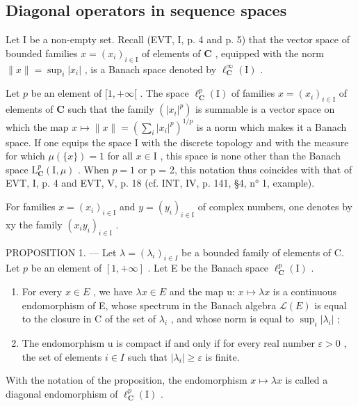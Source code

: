 \subsection{Diagonal operators in sequence spaces}

Let I be a non-empty set. Recall (EVT, I, p. 4 and p. 5) that the vector space of bounded families \(x = (x_i)_{i \in \mathrm{I}}\) of elements of \(\mathbf{C}\) , equipped with the norm \(\| x \| = \sup_i |x_i|\) , is a Banach space denoted by \(\ell_{\mathbf{C}}^{\infty}(\mathrm{I})\) .

Let \(p\) be an element of \([1, +\infty[\) . The space \(\ell_{\mathbf{C}}^{p}(\mathrm{I})\) of families \(x = (x_{i})_{i \in \mathrm{I}}\) of elements of \(\mathbf{C}\) such that the family \((|x_{i}|^{p})\) is summable is a vector space on which the map \(x \mapsto \| x \| = (\sum_{i} |x_{i}|^{p})^{1/p}\) is a norm which makes it a Banach space. If one equips the space I with the discrete topology and with the measure for which \(\mu(\{x\}) = 1\) for all \(x \in \mathrm{I}\) , this space is none other than the Banach space \(\mathrm{L}_{\mathbf{C}}^{p}(\mathrm{I}, \mu)\) . When \(p = 1\) or p = 2, this notation thus coincides with that of EVT, I, p. 4 and EVT, V, p. 18 (cf. INT, IV, p. 141, §4, n° 1, example).

For families \(x = (x_{i})_{i \in \mathrm{I}}\) and \(y = (y_{i})_{i \in \mathrm{I}}\) of complex numbers, one denotes by xy the family \((x_{i}y_{i})_{i \in \mathrm{I}}\) .

PROPOSITION 1. --- Let \(\lambda = (\lambda_i)_{i\in I}\) be a bounded family of elements of C. Let \(p\) be an element of \([1, +\infty]\) . Let E be the Banach space \(\ell_{\mathbf{C}}^p (\mathrm{I})\) .

\begin{enumerate}
\def\labelenumi{\alph{enumi})}
\item
  For every \(x \in E\) , we have \(\lambda x \in E\) and the map u: \(x \mapsto \lambda x\) is a continuous endomorphism of E, whose spectrum in the Banach algebra \(\mathcal{L}(E)\) is equal to the closure in C of the set of \(\lambda_{i}\) , and whose norm is equal to \(\sup_{i} |\lambda_{i}|\) ;
\item
  The endomorphism u is compact if and only if for every real number \(\varepsilon > 0\) , the set of elements \(i \in I\) such that \(|\lambda_{i}| \geqslant \varepsilon\) is finite.
\end{enumerate}

With the notation of the proposition, the endomorphism \(x \mapsto \lambda x\) is called a diagonal endomorphism of \(\ell_{\mathbf{C}}^{p}(\mathrm{I})\) .

